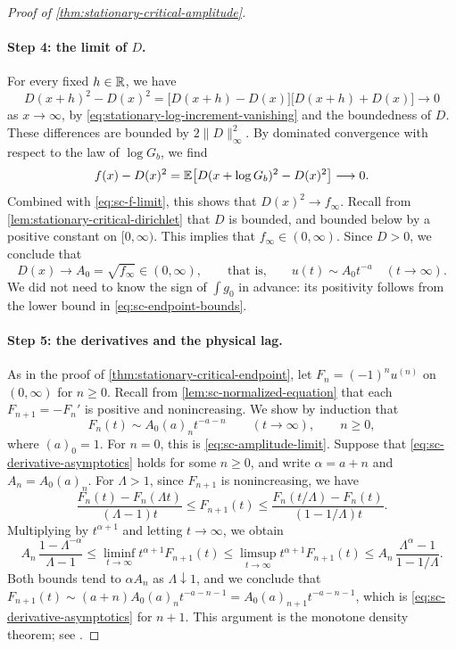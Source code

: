 \begin{proof}[Proof of \cref{thm:stationary-critical-amplitude}]
\paragraph{Step 4: the limit of $D$.} For every fixed $h\in\mathbb R$, we have
\[
 D(x+h)^2-D(x)^2=\bigl[D(x+h)-D(x)\bigr]\bigl[D(x+h)+D(x)\bigr]\longrightarrow0
\]
as $x\to\infty$, by \eqref{eq:stationary-log-increment-vanishing} and the boundedness of $D$. These differences are bounded by $2\|D\|_\infty^2$. By dominated convergence with respect to the law of $\log G_b$, we find
\[
 f(x)-D(x)^2=\mathbb E\bigl[D(x+\log G_b)^2-D(x)^2\bigr]\longrightarrow0 .
\]
Combined with \eqref{eq:sc-f-limit}, this shows that $D(x)^2\to f_\infty$. Recall from \cref{lem:stationary-critical-dirichlet} that $D$ is bounded, and bounded below by a positive constant on $[0,\infty)$. This implies that $f_\infty\in(0,\infty)$. Since $D>0$, we conclude that
\begin{equation}\label{eq:sc-amplitude-limit}
 D(x)\longrightarrow A_0=\sqrt{f_\infty}\in(0,\infty),\qquad\text{that is,}\qquad u(t)\sim A_0t^{-a}\quad(t\to\infty).
\end{equation}
We did not need to know the sign of $\int g_0$ in advance: its positivity follows from the lower bound in \eqref{eq:sc-endpoint-bounds}.

\paragraph{Step 5: the derivatives and the physical lag.} As in the proof of \cref{thm:stationary-critical-endpoint}, let $F_n=(-1)^nu^{(n)}$ on $(0,\infty)$ for $n\ge0$. Recall from \cref{lem:sc-normalized-equation} that each $F_{n+1}=-F_n'$ is positive and nonincreasing. We show by induction that
\begin{equation}\label{eq:sc-derivative-asymptotics}
 F_n(t)\sim A_0(a)_nt^{-a-n}\qquad(t\to\infty),\qquad n\ge0,
\end{equation}
where $(a)_0=1$. For $n=0$, this is \eqref{eq:sc-amplitude-limit}. Suppose that \eqref{eq:sc-derivative-asymptotics} holds for some $n\ge0$, and write $\alpha=a+n$ and $A_n=A_0(a)_n$. For $\Lambda>1$, since $F_{n+1}$ is nonincreasing, we have
\[
 \frac{F_n(t)-F_n(\Lambda t)}{(\Lambda-1)t}\le F_{n+1}(t)\le\frac{F_n(t/\Lambda)-F_n(t)}{(1-1/\Lambda)t}.
\]
Multiplying by $t^{\alpha+1}$ and letting $t\to\infty$, we obtain
\[
 A_n\,\frac{1-\Lambda^{-\alpha}}{\Lambda-1}\le\liminf_{t\to\infty}t^{\alpha+1}F_{n+1}(t)
 \le\limsup_{t\to\infty}t^{\alpha+1}F_{n+1}(t)\le A_n\,\frac{\Lambda^\alpha-1}{1-1/\Lambda}.
\]
Both bounds tend to $\alpha A_n$ as $\Lambda\downarrow1$, and we conclude that $F_{n+1}(t)\sim(a+n)A_0(a)_nt^{-a-n-1}=A_0(a)_{n+1}t^{-a-n-1}$, which is \eqref{eq:sc-derivative-asymptotics} for $n+1$. This argument is the monotone density theorem; see \cite[Section~1.7.3, Theorem~1.7.2 and its following tail-integral variant, p.~39]{bgt1987}.


\end{proof}
